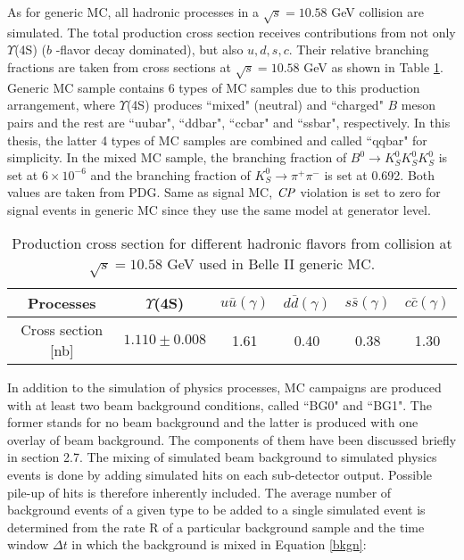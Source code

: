  As for generic MC, all hadronic processes in a  $\sqrt{s} = 10.58 $ GeV collision are simulated. The total production cross section receives contributions from not only $\Upsilon$(4S) ($b$ -flavor decay dominated), but also $u, d, s, c$. 
 Their relative branching fractions are taken from cross sections at  $\sqrt{s} = 10.58 $ GeV as shown in Table \ref{tab:generic_br}. Generic MC sample contains 6 types of MC samples due to this production arrangement, where $\Upsilon$(4S) produces ``mixed" (neutral) and ``charged" $B$ meson pairs and the rest are ``uubar", ``ddbar", ``ccbar" and ``ssbar", respectively. In this thesis, the latter 4 types of MC samples are combined and called ``qqbar" for simplicity. In the mixed MC sample, the branching fraction of $B^0 \to K_S^0  K_S^0  K_S^0$ is set at $6 \times 10^{-6}$ and the branching fraction of $K_S^0 \to \pi^{+}\pi^{-}$ is set at 0.692. Both values are taken from PDG\cite{pdg}. Same as signal MC, $\it{CP}$ violation is set to zero for signal events in generic MC since they use the same model at generator level.
 
 \begin{table}
 	\caption{Production cross section for different hadronic flavors from collision at  $\sqrt{s} = 10.58 $ GeV used in Belle II generic MC.\cite{b2book}}
 	\label{tab:generic_br}
 	\centering
 	\begin{tabular}{c|c|c|c|c|c}
 		\hline 
 	Processes & $\Upsilon$(4S) & $u\bar{u}(\gamma)$ & $d\bar{d}(\gamma)$ & $s\bar{s}(\gamma)$ & $c\bar{c}(\gamma)$ \\
 		\hline 
 	Cross section [nb] & $1.110\pm0.008$ & 1.61 & 0.40 & 0.38 & 1.30 \\
 	\hline
 	\end{tabular}
 \end{table}
 
In addition to the simulation of physics processes,  MC campaigns are produced with at least two beam background conditions, called ``BG0" and ``BG1". The former stands for no beam background and the latter is produced with one overlay of beam background. The components of them have been discussed briefly in section 2.7. The mixing of simulated beam background to simulated physics events is done by adding simulated hits on each sub-detector output. Possible pile-up of hits is therefore inherently included. The average number of background events of a given type to be added to a single simulated event is determined from the rate R of a particular background sample and the time window $\Delta t$ in which the background is mixed in Equation \ref{bkgn}:

